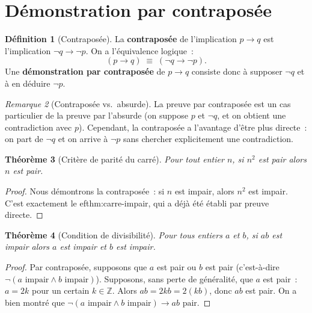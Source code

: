 \documentclass[12pt,a4paper,openany]{book}
\theoremstyle{definition}
\newtheorem{definition}{Définition}[chapter]
\theoremstyle{plain}
\newtheorem{theoreme}[definition]{Théorème}
\theoremstyle{remark}
\newtheorem{remarque}[definition]{Remarque}
\newcommand{\Z}{\mathbb{Z}}
\begin{document}
\section{D\'emonstration par contrapos\'ee}
\label{sec:preuve-contraposee}

\begin{definition}[Contrapos\'ee]\label{def:contraposee}
  La \textbf{contrapos\'ee} de l'implication $p \to q$ est l'implication $\neg q \to \neg p$. On a l'\'equivalence logique~:
  \[
    (p \to q) \;\equiv\; (\neg q \to \neg p).
  \]
  Une \textbf{d\'emonstration par contrapos\'ee} de $p \to q$ consiste donc \`a supposer $\neg q$ et \`a en d\'eduire $\neg p$.
\end{definition}

\begin{remarque}[Contrapos\'ee vs.\ absurde]\label{rem:contrap-vs-absurde}
  La preuve par contrapos\'ee est un cas particulier de la preuve par l'absurde (on suppose $p$ et $\neg q$, et on obtient une contradiction avec $p$). Cependant, la contrapos\'ee a l'avantage d'\^etre plus directe~: on part de $\neg q$ et on arrive \`a $\neg p$ sans chercher explicitement une contradiction.
\end{remarque}

\begin{theoreme}[Crit\`ere de parit\'e du carr\'e]\label{thm:carre-pair}
  Pour tout entier $n$, si $n^2$ est pair alors $n$ est pair.
\end{theoreme}

\begin{proof}
  Nous d\'emontrons la contrapos\'ee~: si $n$ est impair, alors $n^2$ est impair. C'est exactement le 
ef{thm:carre-impair}, qui a d\'ej\`a \'et\'e \'etabli par preuve directe.
\end{proof}

\begin{theoreme}[Condition de divisibilit\'e]\label{thm:div-contrap}
  Pour tous entiers $a$ et $b$, si $ab$ est impair alors $a$ est impair et $b$ est impair.
\end{theoreme}

\begin{proof}
  Par contrapos\'ee, supposons que $a$ est pair ou $b$ est pair (c'est-\`a-dire $\neg(a \text{ impair} \land b \text{ impair})$). Supposons, sans perte de g\'en\'eralit\'e, que $a$ est pair~: $a = 2k$ pour un certain $k \in \Z$. Alors $ab = 2kb = 2(kb)$, donc $ab$ est pair. On a bien montr\'e que $\neg(a \text{ impair} \land b \text{ impair}) \to ab \text{ pair}$.
\end{proof}
\end{document}
